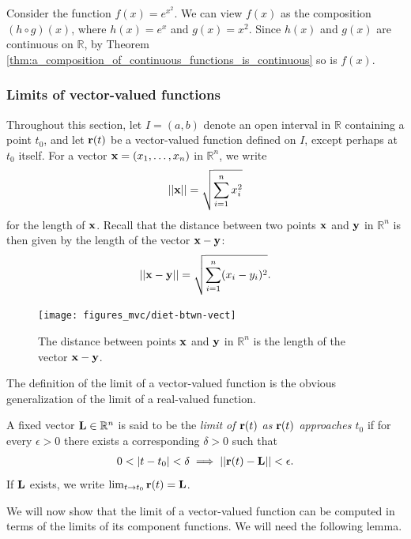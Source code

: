 \documentclass[12pt,letterpaper,reqno]{article}
\numberwithin{equation}{section}
\newcommand{\R}{\ensuremath{\mathbb R}}
\newcommand{\bl}{{\bf L}}
\newcommand{\bx}{{\bf x}}
\newcommand{\by}{{\bf y}}
\newcommand{\bbr}{{\bf r}}
\begin{document}
{\newpage

\begin{example}
Consider the function $f(x)=e^{x^2}$. We can view $f(x)$ as the composition $(h \circ g)(x)$, where $h(x)=e^x$ and $g(x)=x^2$. Since $h(x)$ and $g(x)$ are continuous on $\R$, by Theorem \ref{thm:a_composition_of_continuous_functions_is_continuous} so is $f(x)$.
\end{example}

\subsubsection{Limits of vector-valued functions}
Throughout this section, let $I=(a,b)$ denote an open interval in $\R$ containing a point $t_0$, and let $\bbr(t)$ be a vector-valued function defined on $I$, except perhaps at $t_0$ itself. For a vector $\bx=(x_1,\dots,x_n)$ in $\R^n$, we write
\begin{align*}
	||\bx||=\sqrt{\sum_{i=1}^n x_i^2}
\end{align*}
for the length of $\bx$. Recall that the distance between two points $\bx$ and $\by$ in $\R^n$ is then given by the length of the vector $\bx-\by$: 
\begin{align*}
	||\bx-\by||=\sqrt{\sum_{i=1}^n (x_i-y_i)^2}.
	\end{align*}
	
\begin{figure}[h]
	\begin{center}
		\texttt{[image: figures\_mvc/diet-btwn-vect]}
	\end{center}
	\caption{The distance between points $\bx$ and $\by$ in $\R^n$ is the length of the vector $\bx-\by$.}
\end{figure}

The definition of the limit of a vector-valued function is the obvious generalization of the limit of a real-valued function.
\begin{defn}
	A fixed vector $\bl \in \mathbb{R}^n$ is said to be the \emph{limit of $\bbr(t)$ as $\bbr(t)$ approaches $t_0$} if for every $\epsilon >0$ there exists a corresponding $\delta > 0$ such that
	\begin{align*}
		0 < |t-t_0|<\delta \implies ||\bbr(t)-{\bf L}||<\epsilon.
	\end{align*}
	If $\bl$ exists, we write $\lim_{t \to t_0}\bbr(t)=\bl$. 
\end{defn}
We will now show that the limit of a vector-valued function can be computed in terms of the limits of its component functions. We will need the following lemma.

}
\end{document}

